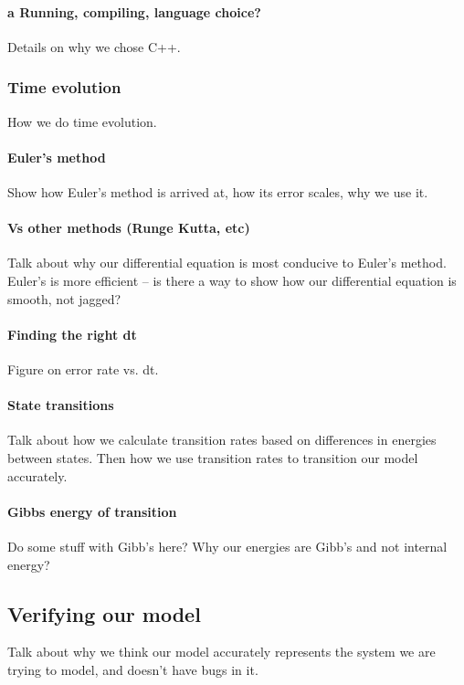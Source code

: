 \documentclass[10pt]{article} %
\begin{document}
\paragraph{a Running, compiling, language choice?}
Details on why we chose C++.\\
\subsubsection{Time evolution}
How we do time evolution.
\paragraph{Euler’s method}
Show how Euler's method is arrived at, how its error scales, why we use it.

\paragraph{Vs other methods (Runge Kutta, etc)}
Talk about why our differential equation is most conducive to Euler's method. Euler's is more
efficient -- is there a way to show how our differential equation is smooth, not jagged?

\paragraph{Finding the right dt}
Figure on error rate vs. dt.

\paragraph{State transitions}
Talk about how we calculate transition rates based on differences in energies between states.
Then how we use transition rates to transition our model accurately.\\

\paragraph{Gibbs energy of transition}
Do some stuff with Gibb's here? Why our energies are Gibb's and not internal energy?\\

\subsection{Verifying our model}
Talk about why we think our model accurately represents the system we are trying to model, and
doesn't have bugs in it.\\
\end{document}
